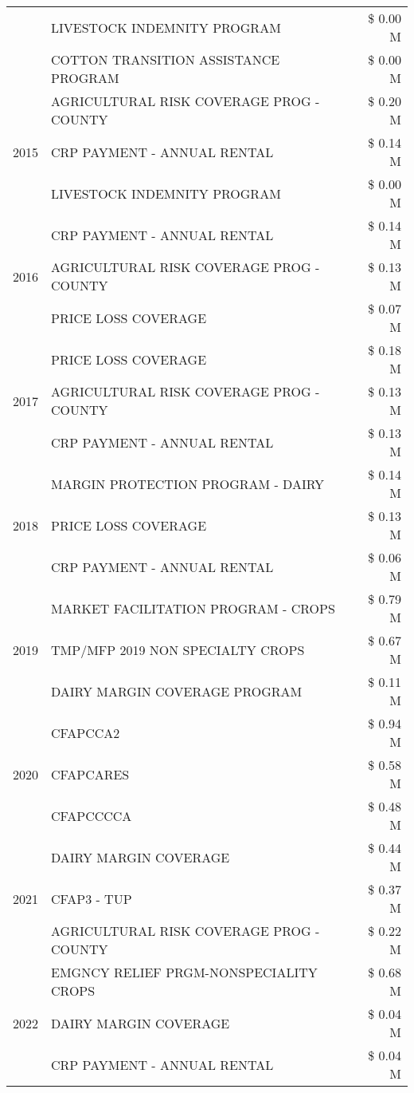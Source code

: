 \begin{tabular}{llr}
 & LIVESTOCK INDEMNITY PROGRAM & \$ 0.00 M \\
 & COTTON TRANSITION ASSISTANCE PROGRAM & \$ 0.00 M \\
\cline{1-3}
\multirow[t]{3}{*}{2015} & AGRICULTURAL RISK COVERAGE PROG - COUNTY & \$ 0.20 M \\
 & CRP PAYMENT - ANNUAL RENTAL & \$ 0.14 M \\
 & LIVESTOCK INDEMNITY PROGRAM & \$ 0.00 M \\
\cline{1-3}
\multirow[t]{3}{*}{2016} & CRP PAYMENT - ANNUAL RENTAL & \$ 0.14 M \\
 & AGRICULTURAL RISK COVERAGE PROG - COUNTY & \$ 0.13 M \\
 & PRICE LOSS COVERAGE & \$ 0.07 M \\
\cline{1-3}
\multirow[t]{3}{*}{2017} & PRICE LOSS COVERAGE & \$ 0.18 M \\
 & AGRICULTURAL RISK COVERAGE PROG - COUNTY & \$ 0.13 M \\
 & CRP PAYMENT - ANNUAL RENTAL & \$ 0.13 M \\
\cline{1-3}
\multirow[t]{3}{*}{2018} & MARGIN PROTECTION PROGRAM - DAIRY & \$ 0.14 M \\
 & PRICE LOSS COVERAGE & \$ 0.13 M \\
 & CRP PAYMENT - ANNUAL RENTAL & \$ 0.06 M \\
\cline{1-3}
\multirow[t]{3}{*}{2019} & MARKET FACILITATION PROGRAM - CROPS & \$ 0.79 M \\
 & TMP/MFP 2019 NON SPECIALTY CROPS & \$ 0.67 M \\
 & DAIRY MARGIN COVERAGE PROGRAM & \$ 0.11 M \\
\cline{1-3}
\multirow[t]{3}{*}{2020} & CFAPCCA2 & \$ 0.94 M \\
 & CFAPCARES & \$ 0.58 M \\
 & CFAPCCCCA & \$ 0.48 M \\
\cline{1-3}
\multirow[t]{3}{*}{2021} & DAIRY MARGIN COVERAGE & \$ 0.44 M \\
 & CFAP3 - TUP & \$ 0.37 M \\
 & AGRICULTURAL RISK COVERAGE PROG - COUNTY & \$ 0.22 M \\
\cline{1-3}
\multirow[t]{3}{*}{2022} & EMGNCY RELIEF PRGM-NONSPECIALITY CROPS & \$ 0.68 M \\
 & DAIRY MARGIN COVERAGE & \$ 0.04 M \\
 & CRP PAYMENT - ANNUAL RENTAL & \$ 0.04 M \\
\cline{1-3}
\bottomrule
\end{tabular}
